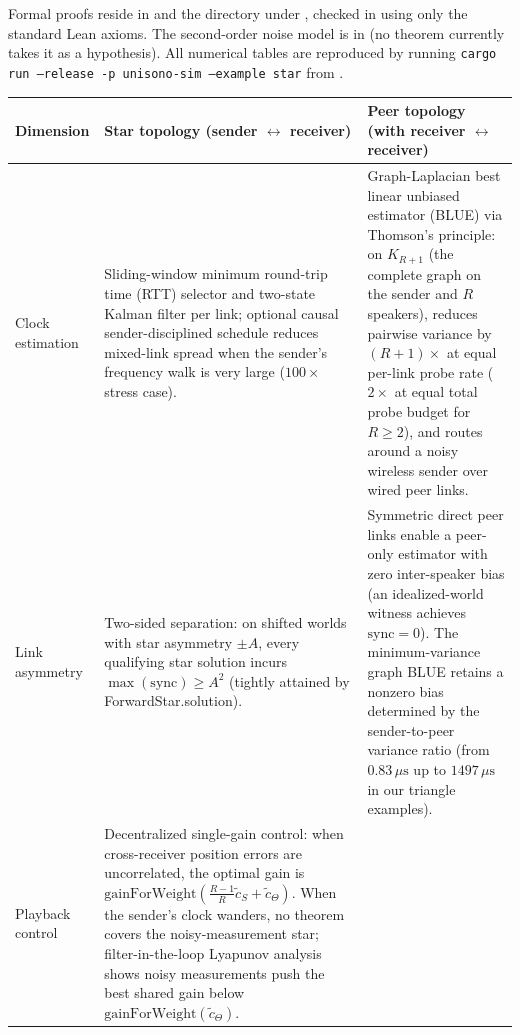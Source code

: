 \documentclass[11pt,a4paper]{article}
\DeclareRobustCommand{\lean}[1]{{\ttfamily\def\_{\textunderscore\allowbreak}#1}}
\theoremstyle{definition}
\begin{document}
Formal proofs reside in  and the
 directory under , checked in
 using only the standard Lean axioms. The
second-order noise model is in 
(no theorem currently takes it as a hypothesis). All numerical tables are
reproduced by running \texttt{cargo run --release -p unisono-sim --example star}
from .

\begin{table}[htb]
\centering
\small
\begin{tabular}{@{}l >{\raggedright\arraybackslash}p{5.8cm} >{\raggedright\arraybackslash}p{6.2cm}@{}}
\toprule
Dimension & Star topology (sender $\leftrightarrow$ receiver) & Peer topology (with receiver $\leftrightarrow$ receiver) \\
\midrule
Clock estimation &
  Sliding-window minimum round-trip time (RTT) selector and two-state Kalman
  filter per link; optional causal sender-disciplined schedule reduces mixed-link
  spread when the sender's frequency walk is very large ($100\times$ stress case). &
  Graph-Laplacian best linear unbiased estimator (BLUE) via Thomson's principle:
  on $K_{R+1}$ (the complete graph on the sender and $R$ speakers), reduces
  pairwise variance by $(R{+}1)\times$ at equal per-link probe rate ($2\times$
  at equal total probe budget for $R \ge 2$), and routes around a noisy wireless
  sender over wired peer links. \\
\addlinespace[4pt]
Link asymmetry &
  Two-sided separation: on shifted worlds with star asymmetry $\pm A$, every
  qualifying star solution incurs $\max(\mathrm{sync}) \ge A^2$ (tightly
  attained by \lean{ForwardStar.solution}). &
  Symmetric direct peer links enable a peer-only estimator with zero
  inter-speaker bias (an idealized-world witness achieves $\mathrm{sync} = 0$).
  The minimum-variance graph BLUE retains a nonzero bias determined by the
  sender-to-peer variance ratio (from $0.83\,\mu\text{s}$ up to
  $1497\,\mu\text{s}$ in our triangle examples). \\
\addlinespace[4pt]
Playback control &
  Decentralized single-gain control: when cross-receiver position errors are
  uncorrelated, the optimal gain is
  $\mathrm{gainForWeight}(\frac{R-1}{R}\tilde c_S + \tilde c_\Theta)$. When the
  sender's clock wanders, no theorem covers the noisy-measurement star;
  filter-in-the-loop Lyapunov analysis shows noisy measurements push the best
  shared gain below $\mathrm{gainForWeight}(\tilde c_\Theta)$. &

\end{tabular}
\end{table}
\end{document}
